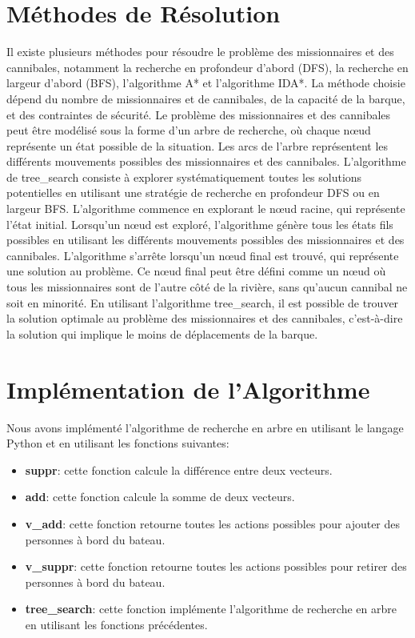 \documentclass{article}
\begin{document}
\section{Méthodes de Résolution}
\par Il existe plusieurs méthodes pour résoudre le problème des missionnaires et des cannibales, notamment la recherche en profondeur d'abord (DFS), la recherche en largeur d'abord (BFS), l'algorithme A* et l'algorithme IDA*. La méthode choisie dépend du nombre de missionnaires et de cannibales, de la capacité de la barque, et des contraintes de sécurité.
\newline
Le problème des missionnaires et des cannibales peut être modélisé sous la forme d'un arbre de recherche, où chaque nœud représente un état possible de la situation. Les arcs de l'arbre représentent les différents mouvements possibles des missionnaires et des cannibales. L'algorithme de tree\_search consiste à explorer systématiquement toutes les solutions potentielles en utilisant une stratégie de recherche en profondeur DFS ou en largeur BFS.
\newline
L'algorithme commence en explorant le nœud racine, qui représente l'état initial. Lorsqu'un nœud est exploré, l'algorithme génère tous les états fils possibles en utilisant les différents mouvements possibles des missionnaires et des cannibales. L'algorithme s'arrête lorsqu'un nœud final est trouvé, qui représente une solution au problème. Ce nœud final peut être défini comme un nœud où tous les missionnaires sont de l'autre côté de la rivière, sans qu'aucun cannibal ne soit en minorité.
\newline
En utilisant l'algorithme tree\_search, il est possible de trouver la solution optimale au problème des missionnaires et des cannibales, c'est-à-dire la solution qui implique le moins de déplacements de la barque.


\section{Implémentation de l'Algorithme}
Nous avons implémenté l'algorithme de recherche en arbre en utilisant le langage Python et en utilisant les fonctions suivantes:
\begin{itemize}
\item \textbf{suppr}: cette fonction calcule la différence entre deux vecteurs.
\item \textbf{add}: cette fonction calcule la somme de deux vecteurs.
\item \textbf{v\_add}: cette fonction retourne toutes les actions possibles pour ajouter des personnes à bord du bateau.
\item \textbf{v\_suppr}: cette fonction retourne toutes les actions possibles pour retirer des personnes à bord du bateau.
\item \textbf{tree\_search}: cette fonction implémente l'algorithme de recherche en arbre en utilisant les fonctions précédentes.
\end{itemize}
\end{document}
